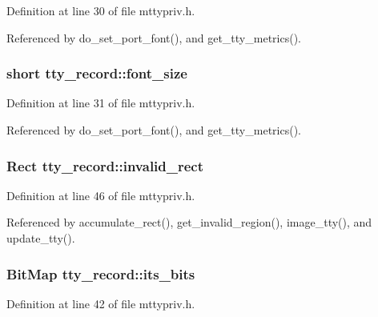 Definition at line 30 of file mttypriv.\+h.



Referenced by do\+\_\+set\+\_\+port\+\_\+font(), and get\+\_\+tty\+\_\+metrics().

\hypertarget{structtty__record_a715bf280d2dbfe8b29a0c18271e13410}{
\subsubsection[{font\+\_\+size}]{\setlength{\rightskip}{0pt plus 5cm}short tty\+\_\+record\+::font\+\_\+size}}\label{structtty__record_a715bf280d2dbfe8b29a0c18271e13410}


Definition at line 31 of file mttypriv.\+h.



Referenced by do\+\_\+set\+\_\+port\+\_\+font(), and get\+\_\+tty\+\_\+metrics().

\hypertarget{structtty__record_a023de9278dd71dd9872bd6de0f3aed05}{
\subsubsection[{invalid\+\_\+rect}]{\setlength{\rightskip}{0pt plus 5cm}Rect tty\+\_\+record\+::invalid\+\_\+rect}}\label{structtty__record_a023de9278dd71dd9872bd6de0f3aed05}


Definition at line 46 of file mttypriv.\+h.



Referenced by accumulate\+\_\+rect(), get\+\_\+invalid\+\_\+region(), image\+\_\+tty(), and update\+\_\+tty().

\hypertarget{structtty__record_a31376f33821be3f31ed01040d5888a72}{
\subsubsection[{its\+\_\+bits}]{\setlength{\rightskip}{0pt plus 5cm}Bit\+Map tty\+\_\+record\+::its\+\_\+bits}}\label{structtty__record_a31376f33821be3f31ed01040d5888a72}


Definition at line 42 of file mttypriv.\+h.




